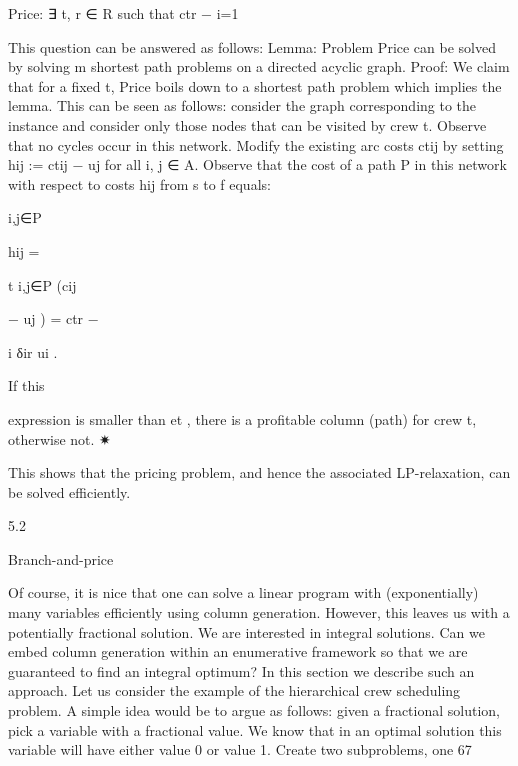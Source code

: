 \documentclass[titlepage]{book}
\theoremstyle{plain}
\theoremstyle{definition}
\theoremstyle{remark}
\begin{document}
Price: ∃ t, r ∈ R such that ctr −
i=1

This question can be answered as follows:
Lemma: Problem Price can be solved by solving m shortest path problems on a directed acyclic graph.
Proof: We claim that for a fixed t, Price boils down to a shortest path problem which implies the lemma.
This can be seen as follows: consider the graph corresponding to the instance and consider only those
nodes that can be visited by crew t. Observe that no cycles occur in this network. Modify the existing
arc costs ctij by setting hij := ctij − uj for all {i, j} ∈ A. Observe that the cost of a path P in this network
with respect to costs hij from s to f equals:

{i,j}∈P

hij =

t
{i,j}∈P (cij

− uj ) = ctr −

i δir ui .

If this

expression is smaller than et , there is a profitable column (path) for crew t, otherwise not.
✷

This shows that the pricing problem, and hence the associated LP-relaxation, can be solved efficiently.

5.2

Branch-and-price

Of course, it is nice that one can solve a linear program with (exponentially) many variables efficiently
using column generation. However, this leaves us with a potentially fractional solution. We are interested
in integral solutions. Can we embed column generation within an enumerative framework so that we are
guaranteed to find an integral optimum? In this section we describe such an approach.
Let us consider the example of the hierarchical crew scheduling problem. A simple idea would be to
argue as follows: given a fractional solution, pick a variable with a fractional value. We know that
in an optimal solution this variable will have either value 0 or value 1. Create two subproblems, one
67
\end{document}

